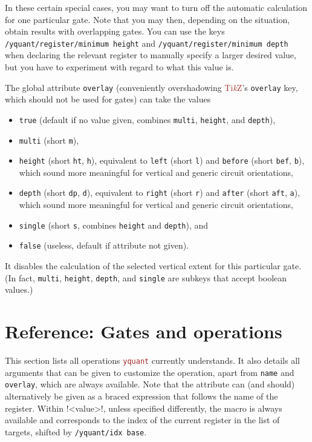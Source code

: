 \documentclass{scrartcl}
\makeatletter
\def\TikZ{\textcolor{brown}{Ti\textit kZ}}
\def\pkg#1{\textcolor{brown}{\texttt{#1}}}
\def\ttlink{\link\texttt}
\def\texlink{\link\tex}
\def\Yquant{\pkg{yquant}}
\newcommand*{\the@orig@section}{}
\let\the@orig@section=\section
\renewcommand*{\section}{%
   \clearpage%
   \the@orig@section%
}
\makeatother
\begin{document}
         In these certain special cases, you may want to turn off the automatic calculation for one particular gate.
         Note that you may then, depending on the situation, obtain results with overlapping gates.
         You can use the keys \ttlink{/yquant/register/minimum height} and \ttlink{/yquant/register/minimum depth} when declaring the relevant register to manually specify a larger desired value, but you have to experiment with regard to what this value is.

         The global attribute \texttt{overlay} (conveniently overshadowing \TikZ's \texttt{overlay} key, which should not be used for gates) can take the values
         \begin{itemize}
            \item \texttt{true} (default if no value given, combines \texttt{multi}, \texttt{height}, and \texttt{depth}),
            \item \texttt{multi} (short \texttt{m}),
            \item \texttt{height} (short \texttt{ht}, \texttt{h}), equivalent to \texttt{left} (short \texttt{l}) and \texttt{before} (short \texttt{bef}, \texttt{b}), which sound more meaningful for vertical and generic circuit orientations,
            \item \texttt{depth} (short \texttt{dp}, \texttt{d}), equivalent to \texttt{right} (short \texttt{r}) and \texttt{after} (short \texttt{aft}, \texttt{a}), which sound more meaningful for vertical and generic circuit orientations,
            \item \texttt{single} (short \texttt{s}, combines \texttt{height} and \texttt{depth}), and
            \item \texttt{false} (useless, default if attribute not given).
         \end{itemize}
         It disables the calculation of the selected vertical extent for this particular gate.
         (In fact, \texttt{multi}, \texttt{height}, \texttt{depth}, and \texttt{single} are subkeys that accept boolean values.)

   \section{Reference: Gates and operations}\label{sec:gates}
      This section lists all operations \Yquant{} currently understands.
      It also details all arguments that can be given to customize the operation, apart from \ttlink{name} and \ttlink{overlay}, which are always available.
      Note that the \texlink[value]{[value=<value>]} attribute can (and should) alternatively be given as a braced expression that follows the name of the register.
      Within \tex!<value>!, unless specified differently, the macro \texlink{\idx} is always available and corresponds to the index of the current register in the list of targets, shifted by \ttlink{/yquant/idx base}.
\end{document}
